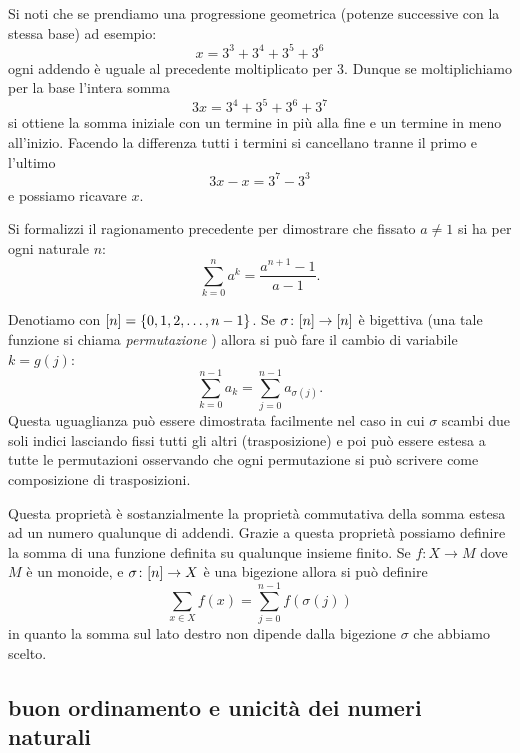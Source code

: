 \begin{exercise}
Si noti che se prendiamo una progressione geometrica 
(potenze successive con la stessa base) 
ad esempio:
\[
  x = 3^3 + 3^4 + 3^5 + 3^6
\]
ogni addendo è uguale al precedente moltiplicato per $3$.
Dunque se moltiplichiamo per la base l'intera somma
\[
  3x = 3^4 + 3^5 + 3^6 + 3^7
\]
si ottiene la somma iniziale con un termine in più alla fine 
e un termine in meno all'inizio. 
Facendo la differenza tutti i termini si cancellano tranne 
il primo e l'ultimo
\[
 3x - x = 3^7 - 3^3  
\]
e possiamo ricavare $x$.

Si formalizzi il ragionamento precedente per dimostrare che 
fissato $a\neq 1$ si ha per ogni naturale $n$:
  \[
    \sum_{k=0}^n a^k = \frac{a^{n+1}-1}{a-1}.
  \] 
\end{exercise}

Denotiamo con ${\left[ n \right]} = {\left\{ 0,1,2, \dots, n-1 \right\}}$.
Se $\sigma\colon {\left[ n \right]} \to {\left[ n \right]}$
è bigettiva (una tale funzione si chiama \emph{permutazione}%
%
)
allora si può fare il cambio di variabile $k=g(j)$:
\[
    \sum_{k=0}^{n-1} a_k = \sum_{j=0}^{n-1} a_{\sigma(j)}.
\]
Questa uguaglianza può essere dimostrata facilmente nel caso 
in cui $\sigma$ scambi due soli indici lasciando fissi tutti gli altri 
(trasposizione) e poi può essere estesa a tutte le permutazioni
osservando che ogni permutazione si può scrivere come composizione 
di trasposizioni.

Questa proprietà è sostanzialmente la proprietà commutativa della somma 
estesa ad un numero qualunque di addendi.
Grazie a questa proprietà possiamo definire la somma di una funzione 
definita su qualunque insieme finito. 
Se $f\colon X \to M$
dove $M$ è un monoide, 
e $\sigma\colon {\left[ n \right]} \to X$ è una bigezione
allora si può definire 
\[
  \sum_{x\in X} f(x) = \sum_{j=0}^{n-1} f(\sigma(j))  
\]
in quanto la somma sul lato destro non dipende dalla bigezione $\sigma$ che 
abbiamo scelto.


\subsection{buon ordinamento e unicità dei numeri naturali}


